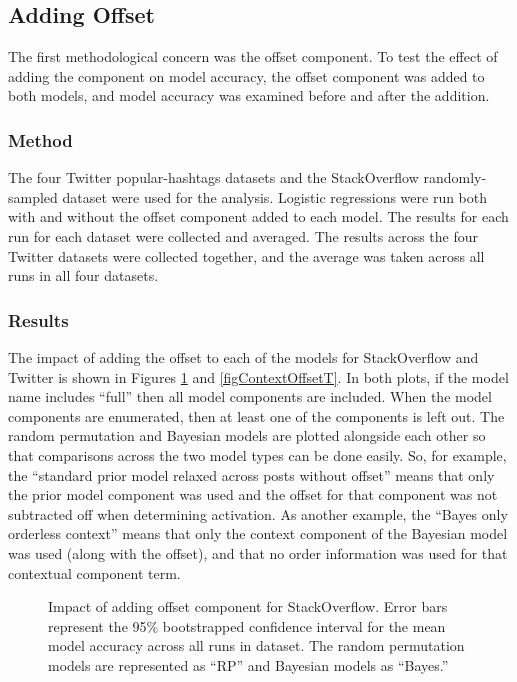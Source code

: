 \documentclass[man,floatsintext,donotrepeattitle]{apa6}
\begin{document}
\subsection{Adding Offset}

The first methodological concern was the offset component.
To test the effect of adding the component on model accuracy, the offset component was added to both models, and model accuracy was examined before and after the addition.

\subsubsection{Method}

The four Twitter popular-hashtags datasets and the StackOverflow randomly-sampled dataset were used for the analysis.
Logistic regressions were run both with and without the offset component added to each model.
The results for each run for each dataset were collected and averaged.
The results across the four Twitter datasets were collected together, and the average was taken across all runs in all four datasets.

\subsubsection{Results}

The impact of adding the offset to each of the models for StackOverflow and Twitter is shown in Figures \ref{figContextOffsetSO} and \ref{figContextOffsetT}.
In both plots, if the model name includes ``full'' then all model components are included.
When the model components are enumerated, then at least one of the components is left out.
The random permutation and Bayesian models are plotted alongside each other so that comparisons across the two model types can be done easily.
So, for example, the ``standard prior model relaxed across posts without offset'' means that only the prior model component was used and the offset for that component was not subtracted off when determining activation.
As another example, the ``Bayes only orderless context'' means that only the context component of the Bayesian model was used (along with the offset), and that no order information was used for that contextual component term.

\begin{figure}[!htbp]
  \caption{
    Impact of adding offset component for StackOverflow.
    Error bars represent the 95\% bootstrapped confidence interval for the mean model accuracy across all runs in dataset.
    The random permutation models are represented as ``RP'' and Bayesian models as ``Bayes.''
}
  \label{figContextOffsetSO}
\end{figure}
\end{document}

